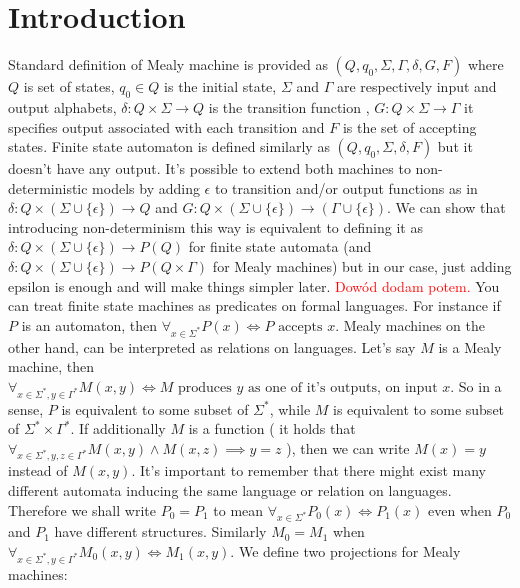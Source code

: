 \documentclass[12pt]{article}
\begin{document}
\maketitle
\lstset{
	basicstyle=\ttfamily,
	mathescape
}

\section{Introduction}
Standard definition of Mealy machine is provided as $(Q,q_0,\Sigma,\Gamma,\delta,G,F)$ where $Q$ is set of states, $q_0 \in Q$ is the initial state, $\Sigma$ and $\Gamma$ are respectively input and output alphabets, $\delta: Q \times \Sigma \rightarrow Q$ is the transition function , $G: Q \times \Sigma \rightarrow \Gamma$ it specifies output associated with each transition and $F$ is the set of accepting states. Finite state automaton is defined similarly as $(Q,q_0,\Sigma,\delta, F)$ but it doesn't have any output. It's possible to extend both machines to non-deterministic models by adding $\epsilon$ to transition and/or output functions as in 
$\delta: Q \times (\Sigma \cup \{\epsilon\})\rightarrow Q$ and $G: Q \times (\Sigma \cup \{\epsilon\})\rightarrow (\Gamma \cup \{\epsilon\})$.  We can show that introducing non-determinism this way is equivalent to defining it as $\delta: Q \times (\Sigma \cup \{\epsilon\})\rightarrow P(Q)$ for finite state automata (and $\delta: Q \times (\Sigma \cup \{\epsilon\}) \rightarrow P(Q \times \Gamma)$ for Mealy machines) but in our case, just adding epsilon is enough and will make things simpler later.  \textcolor{red}{Dowód dodam potem.} You can treat finite state machines as predicates on formal languages. For instance if $P$ is an automaton, then $\forall_{x\in \Sigma^*} P(x) \iff P \textrm{ accepts }x$. Mealy machines on the other hand, can be interpreted as relations on languages. Let's say $M$ is a Mealy machine, then $\forall_{x\in\Sigma^*, y \in \Gamma^*} M(x,y) \iff M \textrm{ produces } y \textrm{ as one of it's outputs, on input } x$. So in a sense, $P$ is equivalent to some subset of $\Sigma^*$, while $M$ is equivalent to some subset of $\Sigma^* \times \Gamma^*$. If additionally $M$ is a function ( it holds that $\forall_{x\in\Sigma^* , y,z \in \Gamma^* } M(x,y) \wedge M(x,z) \implies y=z$ ), then we can write $M(x)=y$ instead of $M(x,y)$. It's important to remember that there  might exist many different automata inducing the same language or relation on languages. Therefore we shall write $P_0 = P_1$ to mean $\forall_{x\in\Sigma^*} P_0(x) \iff P_1(x)$ even when $P_0$ and $P_1$ have different structures. Similarly $M_0 = M_1$ when $\forall_{x \in \Sigma^* , y\in\Gamma^*}M_0(x,y) \iff M_1(x,y)$.  We define two projections for Mealy machines: 
\end{document}
